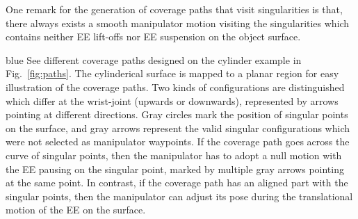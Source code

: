 \documentclass[Afour,sageh,times]{sagej}
\begin{document}
One remark for the generation of coverage paths that visit singularities is that, there always exists a smooth manipulator motion visiting the singularities which contains neither EE lift-offs nor EE suspension on the object surface.  
\begin{color}{blue}
See different coverage paths designed on the cylinder example in Fig.~\ref{fig:paths}. 
The cylinderical surface is mapped to a planar region for easy illustration of the coverage paths. 
Two kinds of configurations are distinguished which differ at the wrist-joint (upwards or downwards), represented by arrows pointing at different directions. 
Gray circles mark the position of singular points on the surface, and gray arrows represent the valid singular configurations which were not selected as manipulator waypoints. 
If the coverage path goes across the curve of singular points, then the manipulator has to adopt a null motion with the EE pausing on the singular point, marked by multiple gray arrows pointing at the same point. 
In contrast, if the coverage path has an aligned part with the singular points, then the manipulator can adjust its pose during the translational motion of the EE on the surface. 




\end{color}
\end{document}
